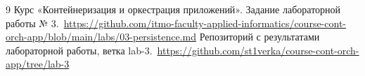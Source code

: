 \begin{thebibliography}{9}
 Курс «Контейнеризация и оркестрация приложений». Задание лабораторной работы № 3.\ \url{https://github.com/itmo-faculty-applied-informatics/course-cont-orch-app/blob/main/labs/03-persistence.md}
 Репозиторий с результатами лабораторной работы, ветка lab-3.\ \url{https://github.com/st1verka/course-cont-orch-app/tree/lab-3}
\end{thebibliography}
